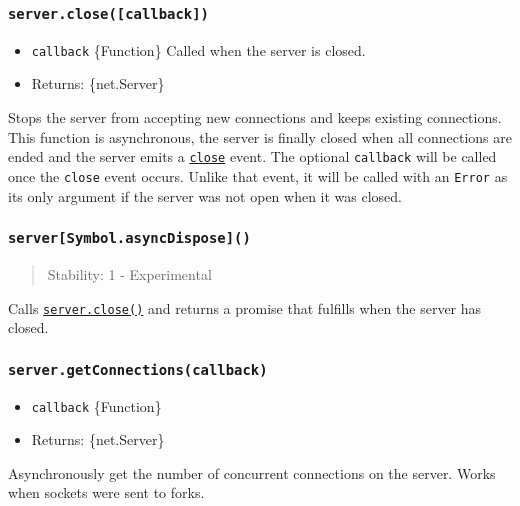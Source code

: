 \subsubsection{\texorpdfstring{\texttt{server.close({[}callback{]})}}{server.close({[}callback{]})}}\label{server.closecallback}

\begin{itemize}
\tightlist
\item
  \texttt{callback} \{Function\} Called when the server is closed.
\item
  Returns: \{net.Server\}
\end{itemize}

Stops the server from accepting new connections and keeps existing
connections. This function is asynchronous, the server is finally closed
when all connections are ended and the server emits a
\hyperref[event-close]{\texttt{\textquotesingle{}close\textquotesingle{}}}
event. The optional \texttt{callback} will be called once the
\texttt{\textquotesingle{}close\textquotesingle{}} event occurs. Unlike
that event, it will be called with an \texttt{Error} as its only
argument if the server was not open when it was closed.

\subsubsection{\texorpdfstring{\texttt{server{[}Symbol.asyncDispose{]}()}}{server{[}Symbol.asyncDispose{]}()}}\label{serversymbol.asyncdispose}

\begin{quote}
Stability: 1 - Experimental
\end{quote}

Calls \hyperref[serverclosecallback]{\texttt{server.close()}} and
returns a promise that fulfills when the server has closed.

\subsubsection{\texorpdfstring{\texttt{server.getConnections(callback)}}{server.getConnections(callback)}}\label{server.getconnectionscallback}

\begin{itemize}
\tightlist
\item
  \texttt{callback} \{Function\}
\item
  Returns: \{net.Server\}
\end{itemize}

Asynchronously get the number of concurrent connections on the server.
Works when sockets were sent to forks.


